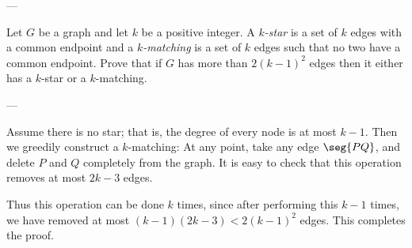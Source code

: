 
---

Let $G$ be a graph and let $k$ be a positive integer. A \emph{$k$-star} is a set of $k$ edges with a common endpoint and a \emph{$k$-matching} is a set of $k$ edges such that no two have a common endpoint. Prove that if $G$ has more than $2(k-1)^2$ edges then it either has a $k$-star or a $k$-matching.

---

Assume there is no star; that is, the degree of every node is at most $k-1$. Then we greedily construct a $k$-matching: At any point, take any edge $\seg{PQ}$, and delete $P$ and $Q$ completely from the graph. It is easy to check that this operation removes at most $2k-3$ edges.

Thus this operation can be done $k$ times, since after performing this $k-1$ times, we have removed at most $(k-1)(2k-3)<2(k-1)^2$ edges. This completes the proof.


